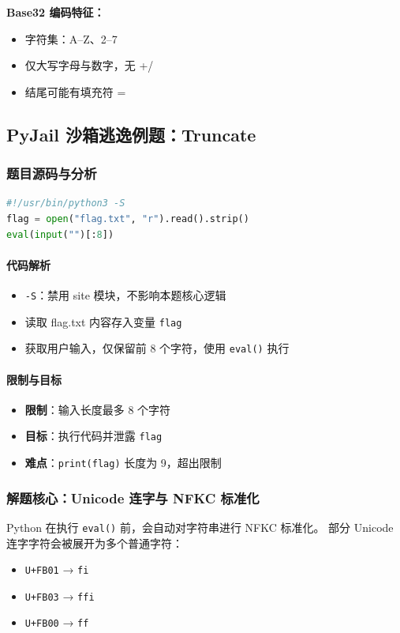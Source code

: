 \textbf{Base32 编码特征：}
\begin{itemize}[leftmargin=*]
    \item 字符集：A–Z、2–7
    \item 仅大写字母与数字，无 +/
    \item 结尾可能有填充符 =
\end{itemize}

\subsection{PyJail 沙箱逃逸例题：Truncate}
\subsubsection{题目源码与分析}
\begin{lstlisting}[language=Python]
#!/usr/bin/python3 -S
flag = open("flag.txt", "r").read().strip()
eval(input("")[:8])
\end{lstlisting}

\paragraph{代码解析}
\begin{itemize}[leftmargin=*]
    \item \texttt{-S}：禁用 site 模块，不影响本题核心逻辑
    \item 读取 flag.txt 内容存入变量 \texttt{flag}
    \item 获取用户输入，仅保留前 8 个字符，使用 \texttt{eval()} 执行
\end{itemize}

\paragraph{限制与目标}
\begin{itemize}[leftmargin=*]
    \item \textbf{限制}：输入长度最多 8 个字符
    \item \textbf{目标}：执行代码并泄露 \texttt{flag}
    \item \textbf{难点}：\texttt{print(flag)} 长度为 9，超出限制
\end{itemize}

\subsubsection{解题核心：Unicode 连字与 NFKC 标准化}
Python 在执行 \texttt{eval()} 前，会自动对字符串进行 NFKC 标准化。
部分 Unicode 连字字符会被展开为多个普通字符：
\begin{itemize}[leftmargin=*]
    \item \texttt{U+FB01} → \texttt{fi}
    \item \texttt{U+FB03} → \texttt{ffi}
    \item \texttt{U+FB00} → \texttt{ff}
\end{itemize}

